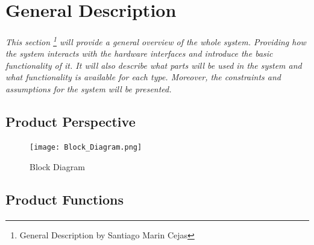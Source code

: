 \documentclass[12pt]{article}
\begin{document}
\section{General Description} \label{gen} %
	\paragraph{}\textit{This section \footnote{General Description by Santiago Marin Cejas} will provide a general overview of the whole system. 
	Providing how the system interacts with the hardware interfaces and introduce the 
	basic functionality of it. It will also describe what parts will be used in the system 
	and what functionality is available for each type. Moreover, the constraints and 
	assumptions for the system will be presented.}
	
	\subsection{Product Perspective}
		\paragraph{} 

		\paragraph{} 
		
		\begin{figure}[h!]
  			\centerline{\texttt{[image: Block\_Diagram.png]}}
  			\caption{Block Diagram}
  			\label{fig:block}
		\end{figure}
		
		\paragraph{} 
		\paragraph{} 	
		\paragraph{} 

	\subsection{Product Functions}
		\paragraph{} 
		
\end{document}
